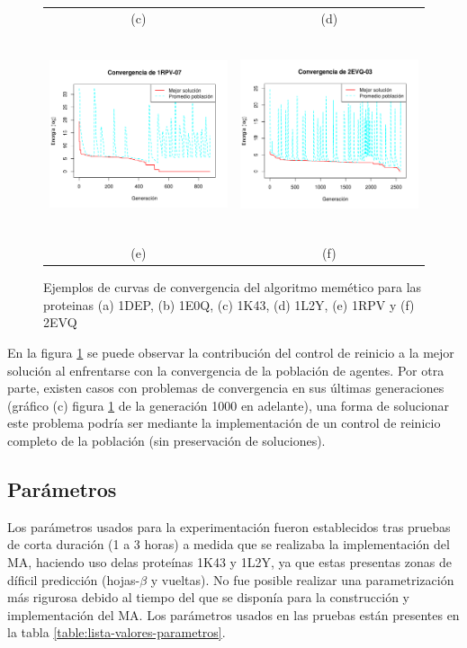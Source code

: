 \begin{figure}
\begin{tabular}{c c}
(c) & (d) \\
\includegraphics[height=6cm]{images/convergencia-1RPV-07.png} & \includegraphics[height=6cm]{images/convergencia-2EVQ-03.png} \\
(e) & (f) \\

\end{tabular}
\caption[Curvas de convergencia]{Ejemplos de curvas de convergencia del algoritmo mem\'etico para las proteinas (a) 1DEP, (b) 1E0Q, (c) 1K43, (d) 1L2Y, (e) 1RPV y (f) 2EVQ}
\label{fig:convergencia}
\end{figure}

En la figura \ref{fig:convergencia} se puede observar la contribución del control de reinicio a la mejor solución al enfrentarse con la convergencia de la población de agentes. Por otra parte, existen casos con problemas de convergencia en sus últimas generaciones (gráfico (c) figura \ref{fig:convergencia}  de la generación 1000 en adelante), una forma de solucionar este problema podría ser mediante la implementación de un control de reinicio completo de la población (sin preservación de soluciones).


\subsection{Parámetros}
Los parámetros usados para la experimentación fueron establecidos tras pruebas de corta duración (1 a 3 horas) a medida que se realizaba la implementación del MA, haciendo uso delas proteínas 1K43 y 1L2Y, ya que estas presentas zonas de díficil predicción (hojas-$\beta$ y vueltas). No fue posible realizar una parametrización más rigurosa debido al tiempo del que se disponía para la construcción y implementación del MA. Los parámetros usados en las pruebas están presentes en la tabla \ref{table:lista-valores-parametros}.

